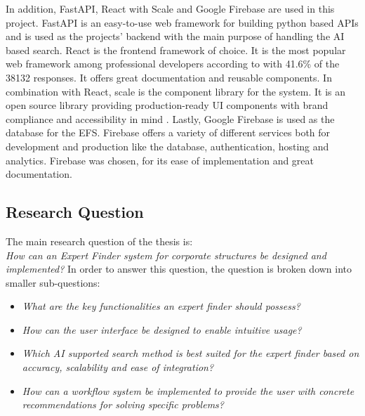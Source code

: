 In addition, FastAPI, React with Scale and Google Firebase are used in this project. FastAPI is an easy-to-use web framework for building python based \acp{API} \parencite{noauthor_fastapi_nodate} and is used as the projects' backend with the main purpose of handling the \ac{AI} based search. React is the frontend framework of choice. It is the most popular web framework among professional developers according to \textcite{noauthor_technology_nodate} with 41.6\% of the 38132 responses. It offers great documentation and reusable components. In combination with React, scale is the component library for the system. It is an open source library providing production-ready UI components with brand compliance and accessibility in mind \parencite{noauthor_faq_nodate}. Lastly, Google Firebase is used as the database for the \ac{EFS}. Firebase offers a variety of different services both for development and production like the database, authentication, hosting and analytics. Firebase was chosen, for its ease of implementation and great documentation.


\subsection{Research Question}
The main research question of the thesis is: \\
\textit{How can an Expert Finder system for corporate structures be designed and implemented?}
In order to answer this question, the question is broken down into smaller sub-questions: 
\begin{itemize}
    \item \textit{What are the key functionalities an expert finder should possess?} 
    \item \textit{How can the user interface be designed to enable intuitive usage?}
    \item \textit{Which \ac{AI} supported search method is best suited for the expert finder based on accuracy, scalability and ease of integration?}
    \item \textit{How can a workflow system be implemented to provide the user with concrete recommendations for solving specific problems?}
\end{itemize}

